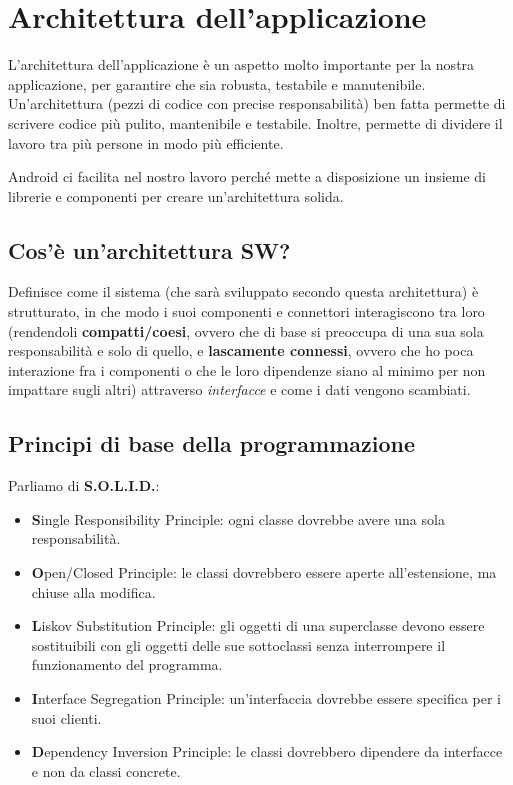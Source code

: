 
\chapter{Architettura dell'applicazione}
\par L'architettura dell'applicazione è un aspetto molto importante per la nostra applicazione, per garantire che sia robusta, testabile e manutenibile. Un'architettura (pezzi di codice con precise responsabilità) ben fatta permette di scrivere codice più pulito, mantenibile e testabile. Inoltre, permette di dividere il lavoro tra più persone in modo più efficiente.
\par Android ci facilita nel nostro lavoro perché mette a disposizione un insieme di librerie e componenti per creare un'architettura solida. 

\section{Cos'è un'architettura SW?}
\par Definisce come il sistema (che sarà sviluppato secondo questa architettura) è strutturato, in che modo i suoi componenti e connettori interagiscono tra loro (rendendoli \textbf{compatti/coesi}, ovvero che di base si preoccupa di una sua sola responsabilità e solo di quello, e \textbf{lascamente connessi}, ovvero che ho poca interazione fra i componenti o che le loro dipendenze siano al minimo per non impattare sugli altri) attraverso \textit{interfacce} e come i dati vengono scambiati.

\section{Principi di base della programmazione}
\par Parliamo di \textbf{S.O.L.I.D.}:
\begin{itemize}
    \item \textbf{S}ingle Responsibility Principle: ogni classe dovrebbe avere una sola responsabilità.
    \item \textbf{O}pen/Closed Principle: le classi dovrebbero essere aperte all'estensione, ma chiuse alla modifica.
    \item \textbf{L}iskov Substitution Principle: gli oggetti di una superclasse devono essere sostituibili con gli oggetti delle sue sottoclassi senza interrompere il funzionamento del programma.
    \item \textbf{I}nterface Segregation Principle: un'interfaccia dovrebbe essere specifica per i suoi clienti.
    \item \textbf{D}ependency Inversion Principle: le classi dovrebbero dipendere da interfacce e non da classi concrete.
\end{itemize}

